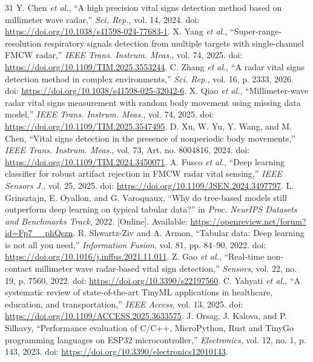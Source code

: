 \documentclass[10pt,conference]{IEEEtran}
\begin{document}
\begin{thebibliography}{31}
 Y. Chen \textit{et al.}, ``A high precision vital signs detection method based on millimeter wave radar,'' \textit{Sci. Rep.}, vol. 14, 2024. doi: \url{https://doi.org/10.1038/s41598-024-77683-1}.
 X. Yang \textit{et al.}, ``Super-range-resolution respiratory signals detection from multiple targets with single-channel FMCW radar,'' \textit{IEEE Trans. Instrum. Meas.}, vol. 74, 2025. doi: \url{https://doi.org/10.1109/TIM.2025.3553244}.
 C. Zhang \textit{et al.}, ``A radar vital signs detection method in complex environments,'' \textit{Sci. Rep.}, vol. 16, p. 2333, 2026. doi: \url{https://doi.org/10.1038/s41598-025-32042-6}.
 X. Qiao \textit{et al.}, ``Millimeter-wave radar vital signs measurement with random body movement using missing data model,'' \textit{IEEE Trans. Instrum. Meas.}, vol. 74, 2025. doi: \url{https://doi.org/10.1109/TIM.2025.3547495}.
 D. Xu, W. Yu, Y. Wang, and M. Chen, ``Vital signs detection in the presence of nonperiodic body movements,'' \textit{IEEE Trans. Instrum. Meas.}, vol. 73, Art. no. 8004816, 2024. doi: \url{https://doi.org/10.1109/TIM.2024.3450071}.
 A. Fusco \textit{et al.}, ``Deep learning classifier for robust artifact rejection in FMCW radar vital sensing,'' \textit{IEEE Sensors J.}, vol. 25, 2025. doi: \url{https://doi.org/10.1109/JSEN.2024.3497797}.
 L. Grinsztajn, E. Oyallon, and G. Varoquaux, ``Why do tree-based models still outperform deep learning on typical tabular data?'' in \textit{Proc. NeurIPS Datasets and Benchmarks Track}, 2022. [Online]. Available: \url{https://openreview.net/forum?id=Fp7__phQszn}.
 R. Shwartz-Ziv and A. Armon, ``Tabular data: Deep learning is not all you need,'' \textit{Information Fusion}, vol. 81, pp. 84--90, 2022. doi: \url{https://doi.org/10.1016/j.inffus.2021.11.011}.
 Z. Gao \textit{et al.}, ``Real-time non-contact millimeter wave radar-based vital sign detection,'' \textit{Sensors}, vol. 22, no. 19, p. 7560, 2022. doi: \url{https://doi.org/10.3390/s22197560}.
 C. Yahyati \textit{et al.}, ``A systematic review of state-of-the-art TinyML applications in healthcare, education, and transportation,'' \textit{IEEE Access}, vol. 13, 2025. doi: \url{https://doi.org/10.1109/ACCESS.2025.3633575}.
 J. Orsag, J. Kalova, and P. Silhavy, ``Performance evaluation of C/C++, MicroPython, Rust and TinyGo programming languages on ESP32 microcontroller,'' \textit{Electronics}, vol. 12, no. 1, p. 143, 2023. doi: \url{https://doi.org/10.3390/electronics12010143}.

\end{thebibliography}
\end{document}
